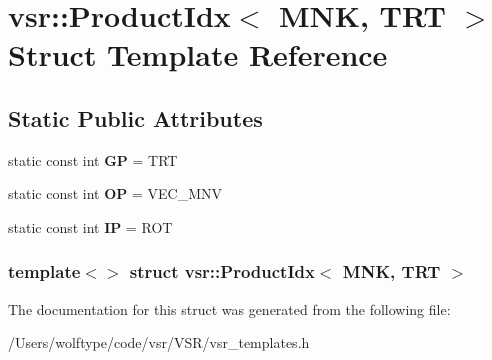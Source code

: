 \hypertarget{structvsr_1_1_product_idx_3_01_m_n_k_00_01_t_r_t_01_4}{\section{vsr\-:\-:Product\-Idx$<$ M\-N\-K, T\-R\-T $>$ Struct Template Reference}
\label{structvsr_1_1_product_idx_3_01_m_n_k_00_01_t_r_t_01_4}
}
\subsection*{Static Public Attributes}
\begin{DoxyCompactItemize}
\item 
\hypertarget{structvsr_1_1_product_idx_3_01_m_n_k_00_01_t_r_t_01_4_a2e9c53f0c8a93d30db6e77e9afc13e89}{static const int {\bfseries G\-P} = T\-R\-T}\label{structvsr_1_1_product_idx_3_01_m_n_k_00_01_t_r_t_01_4_a2e9c53f0c8a93d30db6e77e9afc13e89}

\item 
\hypertarget{structvsr_1_1_product_idx_3_01_m_n_k_00_01_t_r_t_01_4_a307e947259db3e4e127ed6167fc5a2c8}{static const int {\bfseries O\-P} = V\-E\-C\-\_\-\-M\-N\-V}\label{structvsr_1_1_product_idx_3_01_m_n_k_00_01_t_r_t_01_4_a307e947259db3e4e127ed6167fc5a2c8}

\item 
\hypertarget{structvsr_1_1_product_idx_3_01_m_n_k_00_01_t_r_t_01_4_a5c0930a2f1a9d98d473d15d0e9ba95a4}{static const int {\bfseries I\-P} = R\-O\-T}\label{structvsr_1_1_product_idx_3_01_m_n_k_00_01_t_r_t_01_4_a5c0930a2f1a9d98d473d15d0e9ba95a4}

\end{DoxyCompactItemize}
\subsubsection*{template$<$$>$ struct vsr\-::\-Product\-Idx$<$ M\-N\-K, T\-R\-T $>$}



The documentation for this struct was generated from the following file\-:\begin{DoxyCompactItemize}
\item 
/\-Users/wolftype/code/vsr/\-V\-S\-R/vsr\-\_\-templates.\-h\end{DoxyCompactItemize}

